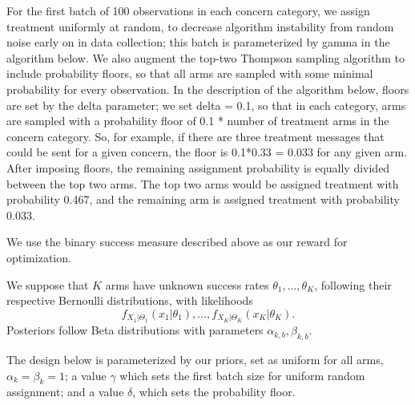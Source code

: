 \documentclass[letterpaper, 12pt, parskip=full,DIV=10]{scrartcl}
\begin{document}
For the first batch of 100 observations in each concern category, we assign treatment uniformly at random, to decrease algorithm instability from random noise early on in data collection; this batch is parameterized by gamma in the algorithm below. We also augment the top-two Thompson sampling algorithm to include probability floors, so that all arms are sampled with some minimal probability for every observation. In the description of the algorithm below, floors are set by the delta parameter; we set delta = 0.1, so that in each category, arms are sampled with a probability floor of 0.1 * number of treatment arms in the concern category. So, for example, if there are three treatment messages that could be sent for a given concern, the floor is 0.1*0.33 = 0.033 for any given arm. After imposing floors, the remaining assignment probability is equally divided between the top two arms. The top two arms would be assigned treatment with probability 0.467, and the remaining arm is assigned treatment with probability 0.033.

We use the binary success measure described above as our reward for optimization. 


%
%

We suppose that $K$ arms have unknown success rates $\theta_1, \dots, \theta_K$, following their respective Bernoulli distributions, with likelihoods
\[f_{X_1|\Theta_1}(x_1|\theta_1),\dots, f_{X_K|\Theta_K}(x_K|\theta_K).\]
Posteriors follow Beta distributions with parameters $\alpha_{k,b}, \beta_{k,b}$. 

The design below is parameterized by our priors, set as uniform for all arms, $\alpha_{k} = \beta_{k} =1$; a value $\gamma$ which sets the first batch size for uniform random assignment; and a value $\delta$, which sets the probability floor. 
\end{document}
